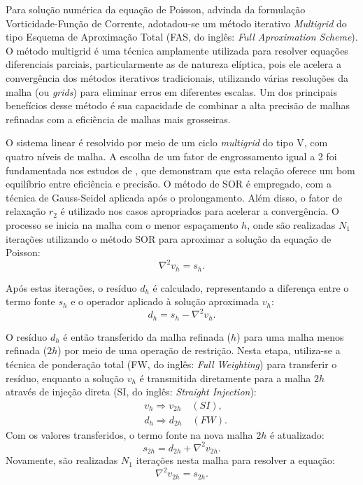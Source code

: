 Para solução numérica da equação de Poisson, advinda da formulação Vorticidade-Função de Corrente, adotadou-se um método iterativo \textit{Multigrid} do tipo Esquema de Aproximação Total (FAS, do inglês: \textit{Full Aproximation Scheme}). O método multigrid é uma técnica amplamente utilizada para resolver equações diferenciais parciais, particularmente as de natureza elíptica, pois ele acelera a convergência dos métodos iterativos tradicionais, utilizando várias resoluções da malha (ou \textit{grids}) para eliminar erros em diferentes escalas. Um dos principais benefícios desse método é sua capacidade de combinar a alta precisão de malhas refinadas com a eficiência de malhas mais grosseiras. 

O sistema linear é resolvido por meio de um ciclo \textit{multigrid} do tipo V, com quatro níveis de malha. A escolha de um fator de engrossamento igual a 2 foi fundamentada nos estudos de , que demonstram que esta relação oferece um bom equilíbrio entre eficiência e precisão. O método de SOR  é empregado, com a técnica de Gauss-Seidel aplicada após o prolongamento. Além disso, o fator de relaxação $r_2$ é utilizado nos casos apropriados para acelerar a convergência. O processo se inicia na malha com o menor espaçamento $h$, onde são realizadas $N_1$ iterações utilizando o método SOR para aproximar a solução da equação de Poisson:
$$
\nabla^2 v_h=s_h .
$$

Após estas iterações, o resíduo $d_h$ é calculado, representando a diferença entre o termo fonte $s_h$ e o operador aplicado à solução aproximada $v_h$:
$$
d_h=s_h-\nabla^2 v_h .
$$

O resíduo $d_h$ é então transferido da malha refinada ($h$) para uma malha menos refinada ($2h$) por meio de uma operação de restrição. Nesta etapa, utiliza-se a técnica de ponderação total (FW, do inglês: \textit{Full Weighting}) para transferir o resíduo, enquanto a solução $v_h$ é transmitida diretamente para a malha $2h$ através de injeção direta (SI, do inglês: \textit{Straight Injection}):
$$
\begin{aligned}
&v_h \Rightarrow v_{2 h} \quad(SI), \\
&d_h \Rightarrow d_{2 h} \quad(FW) .
\end{aligned}
$$
Com os valores transferidos, o termo fonte na nova malha $2h$ é atualizado:
$$
s_{2 h} = d_{2 h}+\nabla^2 v_{2 h} .
$$
Novamente, são realizadas $N_1$ iterações nesta malha para resolver a equação:
$$
\nabla^2 v_{2 h} = s_{2 h} .
$$

